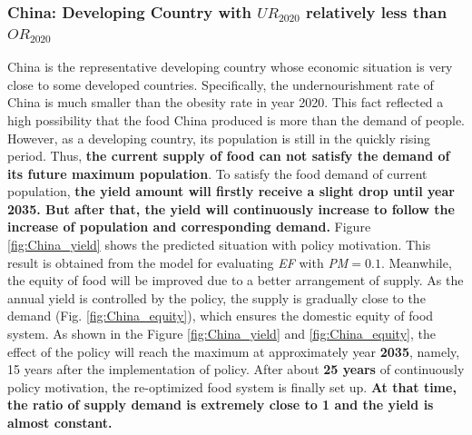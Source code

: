 \documentclass[12pt]{article}
\begin{document}
\subsubsection{China: Developing Country with $UR_{2020}$ relatively less than $OR_{2020}$}
China is the representative developing country whose economic situation is very close to some developed countries. Specifically, the undernourishment rate of China is much smaller than the obesity rate in year 2020. This fact reflected a high possibility that the food China produced is more than the demand of people. However, as a developing country, its population is still in the quickly rising period. Thus, \textbf{the current supply of food can not satisfy the demand of its future maximum population}. To satisfy the food demand of current population, \textbf{the yield amount will firstly receive a slight drop until year 2035. But after that, the yield will continuously increase to follow the increase of population and corresponding demand.} Figure \ref{fig:China_yield} shows the predicted situation with policy motivation. This result is obtained from the model for evaluating \textit{EF} with \textit{PM}$=0.1$. Meanwhile, the equity of food will be improved due to a better arrangement of supply. As the annual yield is controlled by the policy, the supply is gradually close to the demand (Fig. \ref{fig:China_equity}), which ensures the domestic equity of food system. As shown in the Figure \ref{fig:China_yield} and \ref{fig:China_equity}, the effect of the policy will reach the maximum at approximately year \textbf{2035}, namely, 15 years after the implementation of policy. After about \textbf{25 years} of continuously policy motivation, the re-optimized food system is finally set up. \textbf{At that time, the ratio of supply demand is extremely close to 1 and the yield is almost constant.}
\end{document}
